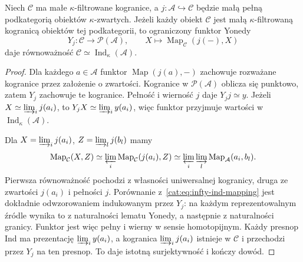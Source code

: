 \begin{twierdzenie}\label{cat:thm:infty-ind-recognition}
Niech $\mathcal C$ ma małe $\kappa$-filtrowane kogranice, a $j:\mathcal A\hookrightarrow\mathcal C$ będzie małą pełną podkategorią obiektów $\kappa$-zwartych. Jeżeli każdy obiekt $\mathcal C$ jest małą $\kappa$-filtrowaną kogranicą obiektów tej podkategorii, to ograniczony funktor Yonedy
\[
 Y_j:\mathcal C\longrightarrow\mathcal P(\mathcal A),\qquad
 X\longmapsto\operatorname{Map}_{\mathcal C}(j(-),X)
\]
daje równoważność $\mathcal C\simeq\operatorname{Ind}_\kappa(\mathcal A)$.
\end{twierdzenie}
\begin{proof}
Dla każdego $a\in\mathcal A$ funktor $\operatorname{Map}(j(a),-)$ zachowuje rozważane kogranice przez założenie o zwartości. Kogranice w $\mathcal P(\mathcal A)$ oblicza się punktowo, zatem $Y_j$ zachowuje te kogranice. Pełność i wierność $j$ daje $Y_jj\simeq y$. Jeżeli $X\simeq\varinjlim_i j(a_i)$, to $Y_jX\simeq\varinjlim_i y(a_i)$, więc funktor przyjmuje wartości w $\operatorname{Ind}_\kappa(\mathcal A)$.

Dla $X=\varinjlim_i j(a_i)$, $Z=\varinjlim_l j(b_l)$ mamy
\[
 \operatorname{Map}_{\mathcal C}(X,Z)
 \simeq\varprojlim_i\operatorname{Map}_{\mathcal C}(j(a_i),Z)
 \simeq\varprojlim_i\varinjlim_l\operatorname{Map}_{\mathcal A}(a_i,b_l).
\]
Pierwsza równoważność pochodzi z własności uniwersalnej kogranicy, druga ze zwartości $j(a_i)$ i pełności $j$. Porównanie z~\eqref{cat:eq:infty-ind-mapping} jest dokładnie odwzorowaniem indukowanym przez $Y_j$: na każdym reprezentowalnym źródle wynika to z naturalności lematu Yonedy, a następnie z naturalności granicy. Funktor jest więc pełny i wierny w sensie homotopijnym. Każdy presnop Ind ma prezentację $\varinjlim_i y(a_i)$, a kogranica $\varinjlim_i j(a_i)$ istnieje w $\mathcal C$ i przechodzi przez $Y_j$ na ten presnop. To daje istotną surjektywność i kończy dowód.
\end{proof}

